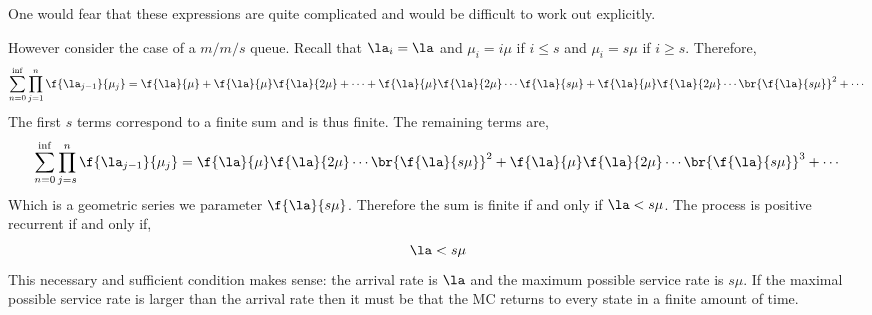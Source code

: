 \documentclass{article}
\begin{document}
    One would fear that these expressions are quite complicated and would be difficult to work out explicitly.
    \begin{example}
        However consider the case of a $m/m/s$ queue. Recall that $\la_i = \la$ and $\mu_i = i \mu$ if $i \leq s$ and $\mu_i = s \mu$ if $i \geq s$. Therefore,
        \[ \sum_{n=0}^{\inf} \prod_{j=1}^{n}\f{\la_{j-1}}{\mu_j} = \f{\la}{\mu} + \f{\la}{\mu} \f{\la}{2\mu} + \cdots + \f{\la}{\mu}\f{\la}{2\mu}\cdots \f{\la}{s\mu} + \f{\la}{\mu}\f{\la}{2\mu}\cdots \br{\f{\la}{s\mu}}^2 +\cdots \]
        The first $s$ terms correspond to a finite sum and is thus finite. The remaining terms are,
        \[ \sum_{n=0}^{\inf} \prod_{j=s}^{n}\f{\la_{j-1}}{\mu_j} = \f{\la}{\mu}\f{\la}{2\mu}\cdots \br{\f{\la}{s\mu}}^2 + \f{\la}{\mu}\f{\la}{2\mu}\cdots \br{\f{\la}{s\mu}}^3 + \cdots \]
        Which is a geometric series we parameter $\f{\la}{s\mu}$. Therefore the sum is finite if and only if $\la < s \mu$. The process is positive recurrent if and only if,
        \[ \la < s \mu \]
        This necessary and sufficient condition makes sense: the arrival rate is $\la$ and the maximum possible service rate is $s \mu$. If the maximal possible service rate is larger than the arrival rate then it must be that the MC returns to every state in a finite amount of time.
    \end{example}
\end{document}
